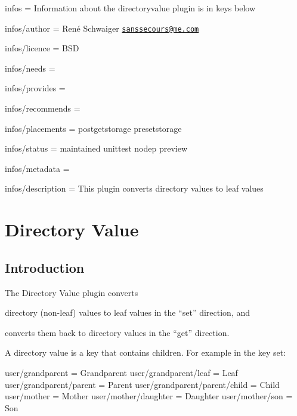 
\begin{DoxyItemize}
\item infos = Information about the directoryvalue plugin is in keys below
\item infos/author = René Schwaiger \href{mailto:sanssecours@me.com}{\tt sanssecours@me.\+com}
\item infos/licence = B\+SD
\item infos/needs =
\item infos/provides =
\item infos/recommends =
\item infos/placements = postgetstorage presetstorage
\item infos/status = maintained unittest nodep preview
\item infos/metadata =
\item infos/description = This plugin converts directory values to leaf values
\end{DoxyItemize}\hypertarget{md_src_plugins_directoryvalue_README_src_plugins_directoryvalue_README_md}{}\section{Directory Value}\label{md_src_plugins_directoryvalue_README_src_plugins_directoryvalue_README_md}
\subsection*{Introduction}

The Directory Value plugin converts


\begin{DoxyEnumerate}
\item directory (non-\/leaf) values to leaf values in the “set” direction, and
\item converts them back to directory values in the “get” direction.
\end{DoxyEnumerate}

A directory value is a key that contains children. For example in the key set\+:


\begin{DoxyCode}
user/grandparent                = Grandparent
user/grandparent/leaf           = Leaf
user/grandparent/parent         = Parent
user/grandparent/parent/child   = Child
user/mother                     = Mother
user/mother/daughter            = Daughter
user/mother/son                 = Son
\end{DoxyCode}


